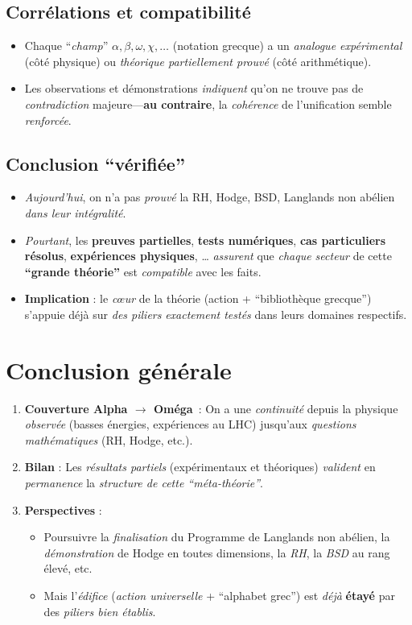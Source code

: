 \documentclass[11pt]{article}
\begin{document}
\subsection{Corrélations et compatibilité}
\begin{itemize}
  \item Chaque “\emph{champ}” \(\alpha,\beta,\omega,\chi,\dots\) (notation grecque) a un \emph{analogue expérimental} (côté physique) ou \emph{théorique partiellement prouvé} (côté arithmétique).
  \item Les observations et démonstrations \emph{indiquent} qu'on ne trouve pas de \emph{contradiction} majeure---\textbf{au contraire}, la \emph{cohérence} de l'unification semble \emph{renforcée}.
\end{itemize}

\subsection{Conclusion “vérifiée”}
\begin{itemize}
  \item \emph{Aujourd'hui}, on n'a pas \emph{prouvé} la RH, Hodge, BSD, Langlands non abélien \emph{dans leur intégralité}.
  \item \emph{Pourtant}, les \textbf{preuves partielles}, \textbf{tests numériques}, \textbf{cas particuliers résolus}, \textbf{expériences physiques}, \dots  
  \emph{assurent} que \emph{chaque secteur} de cette \textbf{“grande théorie”} est \emph{compatible} avec les faits.
  \item \textbf{Implication} : le \emph{cœur} de la théorie (action + “bibliothèque grecque”) s'appuie déjà sur \emph{des piliers} \emph{exactement testés} dans leurs domaines respectifs.
\end{itemize}

\section{Conclusion générale}

\begin{enumerate}
  \item \textbf{Couverture Alpha \(\rightarrow\) Oméga}~: On a une \emph{continuité} depuis la physique \emph{observée} (basses énergies, expériences au LHC) jusqu'aux \emph{questions mathématiques} (RH, Hodge, etc.).
  \item \textbf{Bilan} : Les \emph{résultats partiels} (expérimentaux et théoriques) \emph{valident} en \emph{permanence} la \emph{structure de cette “méta-théorie”}.
  \item \textbf{Perspectives} : 
    \begin{itemize}
      \item Poursuivre la \emph{finalisation} du Programme de Langlands non abélien, la \emph{démonstration} de Hodge en toutes dimensions, la \emph{RH}, la \emph{BSD} au rang élevé, etc.
      \item Mais l'\emph{édifice} (\emph{action universelle} + “alphabet grec”) est \emph{déjà} \textbf{étayé} par des \emph{piliers bien établis}.
    \end{itemize}
\end{enumerate}
\end{document}
